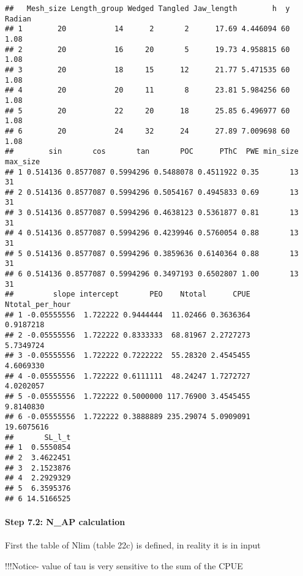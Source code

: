 \documentclass[]{article}
\let\oldparagraph\paragraph
\renewcommand{\paragraph}[1]{\oldparagraph{#1}\mbox{}}
\begin{document}
\begin{verbatim}
##   Mesh_size Length_group Wedged Tangled Jaw_length        h  y Radian
## 1        20           14      2       2      17.69 4.446094 60   1.08
## 2        20           16     20       5      19.73 4.958815 60   1.08
## 3        20           18     15      12      21.77 5.471535 60   1.08
## 4        20           20     11       8      23.81 5.984256 60   1.08
## 5        20           22     20      18      25.85 6.496977 60   1.08
## 6        20           24     32      24      27.89 7.009698 60   1.08
##        sin       cos       tan       POC      PThC  PWE min_size max_size
## 1 0.514136 0.8577087 0.5994296 0.5488078 0.4511922 0.35       13       31
## 2 0.514136 0.8577087 0.5994296 0.5054167 0.4945833 0.69       13       31
## 3 0.514136 0.8577087 0.5994296 0.4638123 0.5361877 0.81       13       31
## 4 0.514136 0.8577087 0.5994296 0.4239946 0.5760054 0.88       13       31
## 5 0.514136 0.8577087 0.5994296 0.3859636 0.6140364 0.88       13       31
## 6 0.514136 0.8577087 0.5994296 0.3497193 0.6502807 1.00       13       31
##         slope intercept       PEO    Ntotal      CPUE Ntotal_per_hour
## 1 -0.05555556  1.722222 0.9444444  11.02466 0.3636364       0.9187218
## 2 -0.05555556  1.722222 0.8333333  68.81967 2.2727273       5.7349724
## 3 -0.05555556  1.722222 0.7222222  55.28320 2.4545455       4.6069330
## 4 -0.05555556  1.722222 0.6111111  48.24247 1.7272727       4.0202057
## 5 -0.05555556  1.722222 0.5000000 117.76900 3.4545455       9.8140830
## 6 -0.05555556  1.722222 0.3888889 235.29074 5.0909091      19.6075616
##       SL_l_t
## 1  0.5550854
## 2  3.4622451
## 3  2.1523876
## 4  2.2929329
## 5  6.3595376
## 6 14.5166525
\end{verbatim}

\paragraph{Step 7.2: N\_AP calculation}\label{step-7.2-n_ap-calculation}

First the table of Nlim (table 22c) is defined, in reality it is in
input

!!!Notice- value of tau is very sensitive to the sum of the CPUE
\end{document}
